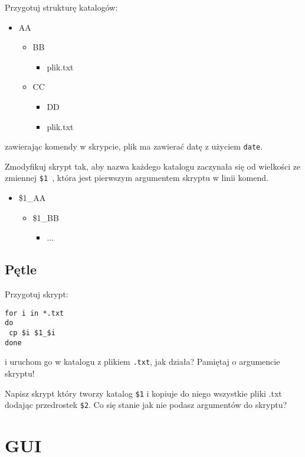 \documentclass{instrukcja}
\begin{document}
Przygotuj strukturę katalogów:

\begin{itemize}
 \item AA
  \begin{itemize}
   \item BB
    \begin{itemize}
     \item plik.txt
    \end{itemize}
   \item CC
    \begin{itemize}
     \item DD
     \item plik.txt
    \end{itemize}
  \end{itemize}
\end{itemize}

zawierając komendy w skrypcie, plik ma zawierać datę z użyciem {\tt date}.

Zmodyfikuj skrypt tak, aby nazwa każdego katalogu zaczynała się od wielkości ze zmiennej {\tt \$1 }, która jest pierwszym argumentem skryptu w linii komend.

\begin{itemize}
 \item \$1\_AA
  \begin{itemize}
   \item \$1\_BB
    \begin{itemize}
     \item ...
    \end{itemize}
  \end{itemize}
\end{itemize}


\subsection{Pętle}
Przygotuj skrypt:
\begin{verbatim}
for i in *.txt
do
 cp $i $1_$i
done
\end{verbatim}
i uruchom go w katalogu z plikiem {\tt .txt}, jak działa? Pamiętaj o argumencie skryptu!


Napisz skrypt który tworzy katalog {\tt \$1} i kopiuje do niego wszystkie pliki .txt dodając przedrostek {\tt \$2}. Co się stanie jak nie podasz argumentów do skryptu?


\section{GUI}
\end{document}
